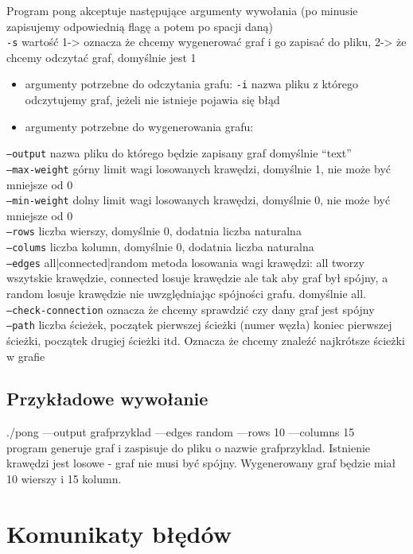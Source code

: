\documentclass[12pt]{article}
\begin{document}
Program pong akceptuje następujące argumenty wywołania (po minusie zapisujemy odpowiednią flagę a potem po spacji daną)\\
\texttt{-s} wartość 1-> oznacza że chcemy wygenerować graf i go zapisać do pliku, 2-> że chcemy odczytać graf, domyślnie jest 1
\begin{itemize}
\item
argumenty potrzebne do odczytania grafu:
\texttt{-i} nazwa pliku z którego odczytujemy graf, jeżeli nie istnieje pojawia się błąd\\
\item
argumenty potrzebne do wygenerowania grafu:
\end{itemize}
\texttt{---output} nazwa pliku do którego będzie zapisany graf domyślnie “text”\\
\texttt{---max-weight} górny limit wagi losowanych krawędzi, domyślnie 1, nie może być mniejsze od 0\\
\texttt{---min-weight} dolny limit wagi losowanych krawędzi, domyślnie 0, nie może być mniejsze od 0\\
\texttt{---rows} liczba wierszy, domyślnie 0, dodatnia liczba naturalna\\
\texttt{---colums} liczba kolumn, domyślnie 0, dodatnia liczba naturalna\\
\texttt{---edges} all|connected|random metoda losowania wagi krawędzi: all tworzy wszytskie krawędzie, connected losuje krawędzie ale tak aby graf był spójny, a random losuje krawędzie nie uwzględniając spójności grafu. domyślnie all. \\
\texttt{---check-connection}  oznacza że chcemy sprawdzić czy dany graf jest spójny\\
\texttt{---path} liczba ścieżek, początek pierwszej ścieżki (numer węzła) koniec pierwszej ścieżki, początek drugiej ścieżki itd. Oznacza że chcemy znaleźć najkrótsze ścieżki w grafie\\

\subsection{Przykładowe wywołanie
}\label{header-n281}
./pong ---output grafprzyklad ---edges random ---rows 10 ---columns 15\\
program generuje graf i zaspisuje do pliku o nazwie grafprzyklad. Istnienie krawędzi jest losowe - graf nie musi być spójny. Wygenerowany graf będzie miał 10 wierszy i 15 kolumn.
\section{Komunikaty błędów
}\label{header-n281}
\end{document}
